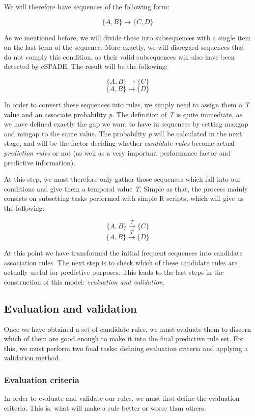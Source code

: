 \documentclass[a4paper,12pt]{article}
\begin{document}
We will therefore have sequences of the following form:

$$\{A, B\} \longrightarrow \{C, D\}$$

As we mentioned before, we will divide these into subsequences with a single item on the last term of the sequence. More exactly, we will disregard sequences that do not comply this condition, as their valid subsequences will also have been detected by cSPADE. The result will be the following:

$$\{A, B\} \longrightarrow \{C\}$$
$$\{A, B\} \longrightarrow \{D\}$$

In order to convert these sequences into rules, we simply need to assign them a \emph{T} value and an associate probability \emph{p}. The definition of \emph{T} is quite immediate, as we have defined exactly the gap we want to have in sequences by setting maxgap and mingap to the same value. The probability \emph{p} will be calculated in the next stage, and will be the factor deciding whether \emph{candidate rules} become actual \emph{prediction rules} or not (as well as a very important performance factor and predictive information).

At this step, we must therefore only gather those sequences which fall into our conditions and give them a temporal value \emph{T}. Simple as that, the process mainly consists on subsetting tasks performed with simple R scripts, which will give us the following:

$$\{A, B\} \xrightarrow{T} \{C\}$$
$$\{A, B\} \xrightarrow{T} \{D\}$$

At this point we have transformed the initial frequent sequences into candidate association rules. The next step is to check which of these candidate rules are actually useful for predictive purposes. This leads to the last steps in the construction of this model: \emph{evaluation and validation}.


\subsection{Evaluation and validation}
\label{sec:validation_evaluation}

Once we have obtained a set of candidate rules, we must evaluate them to discern which of them are good enough to make it into the final predictive rule set. For this, we must perform two final tasks: defining evaluation criteria and applying a validation method.

\subsubsection{Evaluation criteria}
In order to evaluate and validate our rules, we must first define the evaluation criteria. This is, what will make a rule better or worse than others.
\end{document}
